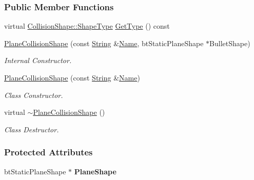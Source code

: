 \subsubsection*{Public Member Functions}
\begin{DoxyCompactItemize}
\item 
virtual \hyperlink{classMezzanine_1_1CollisionShape_ad04186055565998879b64176d6dd100d}{CollisionShape::ShapeType} \hyperlink{classMezzanine_1_1PlaneCollisionShape_aeb4b5e1a235023d375b5514065a5e382}{GetType} () const 
\item 
\hyperlink{classMezzanine_1_1PlaneCollisionShape_aa641f7c918814e3c7555c478c1019161}{PlaneCollisionShape} (const \hyperlink{namespaceMezzanine_acf9fcc130e6ebf08e3d8491aebcf1c86}{String} \&\hyperlink{classMezzanine_1_1CollisionShape_aac524c5c56fa4d158bc071f8aecfbe79}{Name}, btStaticPlaneShape $\ast$BulletShape)
\begin{DoxyCompactList}\small\item\em Internal Constructor. \item\end{DoxyCompactList}\item 
\hyperlink{classMezzanine_1_1PlaneCollisionShape_a70b396bd0e49255dcba099c00b6a073d}{PlaneCollisionShape} (const \hyperlink{namespaceMezzanine_acf9fcc130e6ebf08e3d8491aebcf1c86}{String} \&\hyperlink{classMezzanine_1_1CollisionShape_aac524c5c56fa4d158bc071f8aecfbe79}{Name})
\begin{DoxyCompactList}\small\item\em Class Constructor. \item\end{DoxyCompactList}\item 
\hypertarget{classMezzanine_1_1PlaneCollisionShape_a44a43ced3fff5cd96459f9f832023c39}{
virtual \hyperlink{classMezzanine_1_1PlaneCollisionShape_a44a43ced3fff5cd96459f9f832023c39}{$\sim$PlaneCollisionShape} ()}
\label{classMezzanine_1_1PlaneCollisionShape_a44a43ced3fff5cd96459f9f832023c39}

\begin{DoxyCompactList}\small\item\em Class Destructor. \item\end{DoxyCompactList}\end{DoxyCompactItemize}
\subsubsection*{Protected Attributes}
\begin{DoxyCompactItemize}
\item 
\hypertarget{classMezzanine_1_1PlaneCollisionShape_ac0c34fc0edfb4213b970d6a62be63cda}{
btStaticPlaneShape $\ast$ {\bfseries PlaneShape}}
\label{classMezzanine_1_1PlaneCollisionShape_ac0c34fc0edfb4213b970d6a62be63cda}

\end{DoxyCompactItemize}


